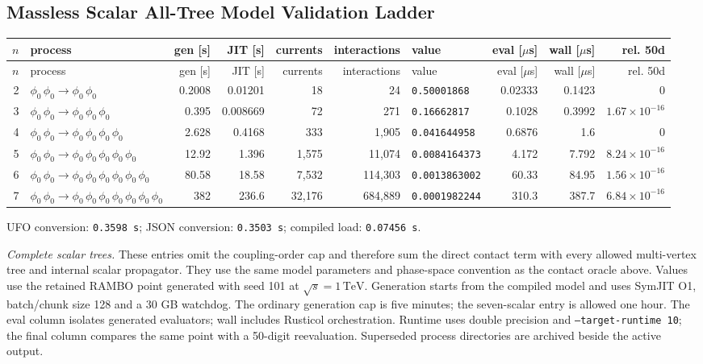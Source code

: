 \subsection*{Massless Scalar All-Tree Model Validation Ladder}
\begingroup
\scriptsize
\setlength{\tabcolsep}{4pt}
\renewcommand{\arraystretch}{1.12}
\begin{longtable}{@{}rL{2.35in}rrrrL{0.78in}rrr@{}}
\toprule
$n$ & process & gen [s] & JIT [s] & currents & interactions & value & eval [$\mu$s] & wall [$\mu$s] & rel. 50d \\
\midrule
\endfirsthead
\toprule
$n$ & process & gen [s] & JIT [s] & currents & interactions & value & eval [$\mu$s] & wall [$\mu$s] & rel. 50d \\
\midrule
{} & $\phi_0\,\phi_0\to \phi_0\,\phi_0$ & 0.2008 & 0.01201 & 18 & 24 & \texttt{0.50001868} & 0.02333 & 0.1423 & 0 \\
3 & $\phi_0\,\phi_0\to \phi_0\,\phi_0\,\phi_0$ & 0.395 & 0.008669 & 72 & 271 & \texttt{0.16662817} & 0.1028 & 0.3992 & $1.67\times10^{-16}$ \\
4 & $\phi_0\,\phi_0\to \phi_0\,\phi_0\,\phi_0\,\phi_0$ & 2.628 & 0.4168 & 333 & 1,905 & \texttt{0.041644958} & 0.6876 & 1.6 & 0 \\
5 & $\phi_0\,\phi_0\to \phi_0\,\phi_0\,\phi_0\,\phi_0\,\phi_0$ & 12.92 & 1.396 & 1,575 & 11,074 & \texttt{0.0084164373} & 4.172 & 7.792 & $8.24\times10^{-16}$ \\
6 & $\phi_0\,\phi_0\to \phi_0\,\phi_0\,\phi_0\,\phi_0\,\phi_0\,\phi_0$ & 80.58 & 18.58 & 7,532 & 114,303 & \texttt{0.0013863002} & 60.33 & 84.95 & $1.56\times10^{-16}$ \\
7 & $\phi_0\,\phi_0\to \phi_0\,\phi_0\,\phi_0\,\phi_0\,\phi_0\,\phi_0\,\phi_0$ & 382 & 236.6 & 32,176 & 684,889 & \texttt{0.0001982244} & 310.3 & 387.7 & $6.84\times10^{-16}$ \\
\bottomrule
\end{longtable}
\noindent UFO conversion: \texttt{0.3598 s}; \quad JSON conversion: \texttt{0.3503 s}; \quad compiled load: \texttt{0.07456 s}.

\par\smallskip
\noindent\textit{Complete scalar trees.} These entries omit the coupling-order cap and therefore sum the direct contact term with every allowed multi-vertex tree and internal scalar propagator. They use the same model parameters and phase-space convention as the contact oracle above.
 Values use the retained RAMBO point generated with seed 101 at $\sqrt{s}=1\,\mathrm{TeV}$. Generation starts from the compiled model and uses SymJIT O1, batch/chunk size 128 and a 30 GB watchdog.
 The ordinary generation cap is five minutes; the seven-scalar entry is allowed one hour.
 The eval column isolates generated evaluators; wall includes Rusticol orchestration. Runtime uses double precision and \texttt{--target-runtime 10}; the final column compares the same point with a 50-digit reevaluation. Superseded process directories are archived beside the active output.
\endgroup
